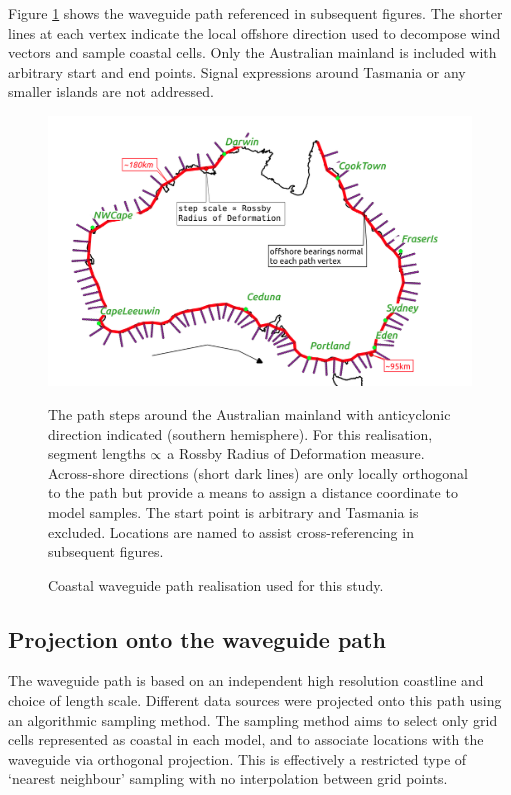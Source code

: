 Figure \ref{fig:CTW_path} shows the waveguide path referenced in subsequent figures.
The shorter lines at each vertex indicate the local offshore direction used to decompose wind vectors and sample coastal cells.
Only the Australian mainland is included with arbitrary start and end points.
Signal expressions around Tasmania or any smaller islands are not addressed. 
\begin{figure}[!hbt] \centering
    \includegraphics[width=\figwidthFull]{figures/maps/map_overview.png}
    \caption{Coastal waveguide path realisation used for this study.}
    {The path steps around the Australian mainland with anticyclonic direction indicated (southern hemisphere). For this realisation, segment lengths $\protect\propto$ a Rossby Radius of Deformation measure. Across-shore directions (short dark lines) are only locally orthogonal to the path but provide a means to assign a distance coordinate to model samples. The start point is arbitrary and Tasmania is excluded. Locations are named to assist cross-referencing in subsequent figures.}
    \label{fig:CTW_path}
\end{figure}  

\subsection{Projection onto the waveguide path}

The waveguide path is based on an independent high resolution coastline and choice of length scale.
Different data sources were projected onto this path using an algorithmic sampling method.
The sampling method aims to select only grid cells represented as coastal in each model, and to associate locations with the waveguide via orthogonal projection. 
This is effectively a restricted type of `nearest neighbour' sampling with no interpolation between grid points.

